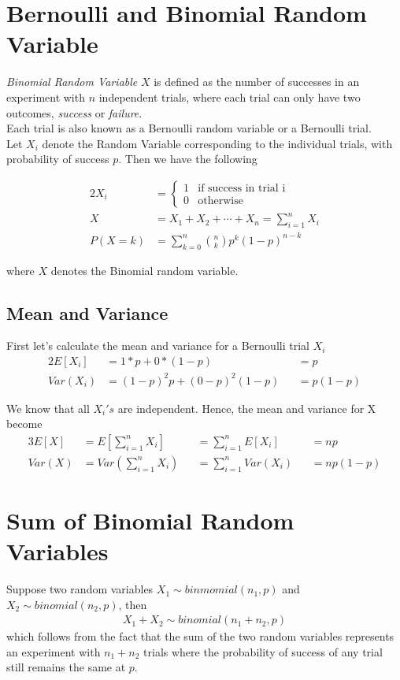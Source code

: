 \documentclass[../../probability-notes.tex]{subfiles}
\begin{document}
    \section{Bernoulli and Binomial Random Variable}
    \emph{Binomial Random Variable} $X$ is defined as the number of successes in an experiment with $n$ independent trials, where each trial can only have two outcomes, \emph{success} or \emph{failure}.\\
    Each trial is also known as a Bernoulli random variable or a Bernoulli trial.\\
    Let $X_{i}$ denote the Random Variable corresponding to the individual trials, with probability of success $p$. Then we have the following

    \begin{alignat*}{2}
        X_{i} &= \begin{cases} 1 &\mbox{if success in trial i}\\
                                0 &\mbox{otherwise} \end{cases} \tag*{indicator variable} \\
        X &= X_{1} + X_{2} + \cdots + X_{n} = \sum_{i=1}^{n} X_{i} \\
        P(X=k) &= \sum_{k=0}^{n} \binom{n}{k} p^{k} (1 - p)^{n-k}
    \end{alignat*}

    where $X$ denotes the Binomial random variable.

    \subsection{Mean and Variance}
    First let's calculate the mean and variance for a Bernoulli trial $X_{i}$
    \begin{alignat*}{2}
        E[X_{i}] &= 1 * p + 0 * (1 - p) &&= p\\
        Var(X_{i}) &= (1 - p)^{2}p + (0-p)^{2}(1-p) &&= p(1-p)
    \end{alignat*}

    We know that all $X_{i}'s$ are independent. Hence, the mean and variance for X become
    \begin{alignat*}{3}
        E[X] &= E[\sum_{i=1}^{n} X_{i}] &&= \sum_{i=1}^{n}E[X_{i}] &&= np \\
        Var(X) &= Var(\sum_{i=1}^{n} X_{i}) &&= \sum_{i=1}^{n} Var(X_{i}) &&= np(1-p)
    \end{alignat*}

    \section{Sum of Binomial Random Variables}
    Suppose two random variables $X_{1} \sim binmomial(n_{1},p)$ and $X_{2} \sim binomial(n_{2},p)$, then
    \begin{align*}
        X_{1} + X_{2} \sim binomial(n_{1} + n_{2}, p)
    \end{align*}
    which follows from the fact that the sum of the two random variables represents an experiment with $n_{1} + n_{2}$ trials where the probability of success of any trial still remains the same at $p$.
\end{document}
